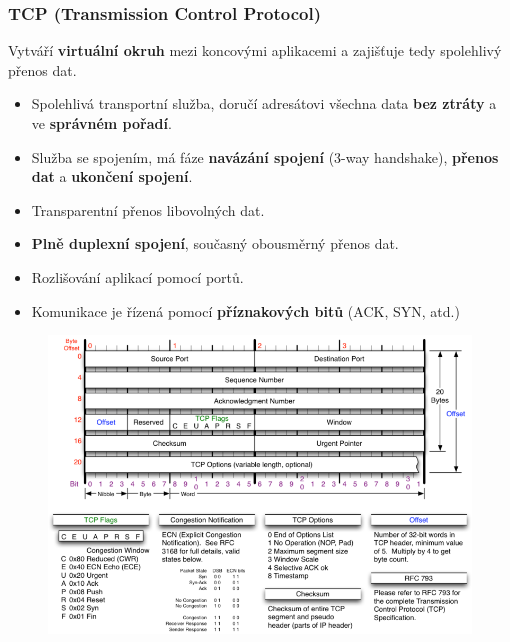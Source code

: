 \subsubsection{TCP (Transmission Control Protocol)}
Vytváří \textbf{virtuální okruh} mezi koncovými aplikacemi a zajišťuje tedy spolehlivý přenos dat.
\begin{itemize}
	\item Spolehlivá transportní služba, doručí adresátovi všechna data \textbf{bez ztráty} a ve \textbf{správném pořadí}.
	\item Služba se spojením, má fáze \textbf{navázání spojení} (3-way handshake), \textbf{přenos dat} a \textbf{ukončení spojení}.
	\item Transparentní přenos libovolných dat.
	\item \textbf{Plně duplexní spojení}, současný obousměrný přenos dat.
	\item Rozlišování aplikací pomocí portů.
	\item Komunikace je řízená pomocí \textbf{příznakových bitů} (ACK, SYN, atd.)
\end{itemize}

\begin{figure}[H]
	\centering
	\includegraphics[width=\textwidth]{assets/4_tcp}
\end{figure}

